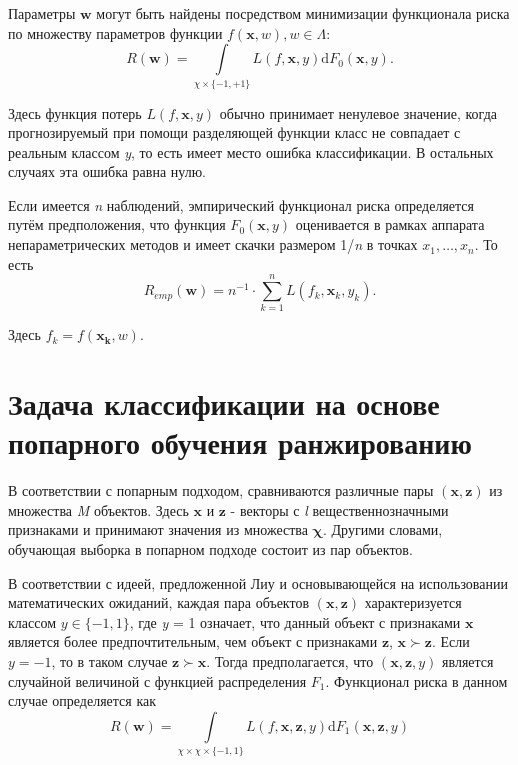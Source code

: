 \documentclass[12pt,a4paper,oneside]{article}
\begin{document}
\begin{multicols}{2}
\par
Параметры \(\mathbf{w}\) могут быть найдены посредством минимизации функционала риска по множеству параметров функции \(f(\mathbf{x}, w), w \in \Lambda\):
\[
R(\mathbf{w}) = \int \limits_{\chi \times \{-1, +1\}} L(f, \mathbf{x}, y) \mathrm{d} F_0(\mathbf{x}, y).
\]

Здесь функция потерь \(L(f, \mathbf{x}, y)\) обычно принимает ненулевое значение, когда прогнозируемый при помощи разделяющей функции класс не совпадает с реальным классом \emph{y}, то есть имеет место ошибка классификации. 
В остальных случаях эта ошибка равна нулю. 

\par
Если имеется \emph{n} наблюдений, эмпирический функционал риска определяется путём предположения, что функция \(F_0(\mathbf{x}, y)\) оценивается в рамках аппарата непараметрических методов  и имеет скачки размером 1/\emph{n} в точках \(x_1, \dots, x_n\). То есть
\[
R_{emp}(\mathbf{w}) = n^{-1} \cdot \sum \limits_{k=1}^n L(f_k, \mathbf{x}_k, y_k).
\]

Здесь \(f_k=f(\mathbf{x_k}, w)\). 


\vspace*{1em}
\chapter{Задача классификации на основе попарного обучения ранжированию}

\par
В соответствии с попарным подходом, сравниваются различные пары \((\mathbf{x},\mathbf{z})\) из множества \emph{M} объектов. 
Здесь \(\mathbf{x}\) и \(\mathbf{z}\) - векторы с \emph{l} вещественнозначными признаками и принимают значения из множества \(\mathbf{\chi}\). 
Другими словами, обучающая выборка в попарном подходе состоит из пар объектов. 

\par
В соответствии с идеей, предложенной Лиу  и основывающейся на использовании математических ожиданий, каждая пара объектов \((\mathbf{x}, \mathbf{z})\) характеризуется классом \(y \in \{-1,1\}\), где \emph{y} = 1 означает, что данный объект с признаками \(\mathbf{x}\) является более предпочтительным, чем объект с признаками \(\mathbf{z}\), \(\mathbf{x} \succ \mathbf{z}\). Если \(y = -1\), то в таком случае \(\mathbf{z} \succ \mathbf{x}\). Тогда предполагается, что \((\mathbf{x}, \mathbf{z}, y)\) является случайной величиной с функцией распределения \(F_1\). Функционал риска в данном случае определяется как
\[
R(\mathbf{w}) = \int \limits_{\chi \times \chi \times \{-1, 1\}} L(f, \mathbf{x}, \mathbf{z}, y) \mathrm{d} F_1(\mathbf{x}, \mathbf{z}, y)
\]


\end{multicols}
\end{document}
